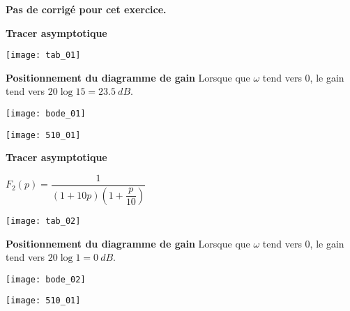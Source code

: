 \normaltrue \difficilefalse \tdifficilefalse
\correctiontrue


\setcounter{numques}{0}
\ifcorrection
\else
\textbf{Pas de corrigé pour cet exercice.}
\fi


\ifprof 
\else
 \fi
 

\ifprof

\textbf{Tracer asymptotique}

\begin{center}
\texttt{[image: tab\_01]}
\end{center}


\textbf{Positionnement du diagramme de gain}
Lorsque que $\omega$ tend vers 0, le gain tend vers $20 \log 15 = \SI{23,5}{dB}$.

\begin{center}
\texttt{[image: bode\_01]}
\end{center}

\else 
\begin{center}
\texttt{[image: 510\_01]}
\end{center}
\fi


\ifprof
\textbf{Tracer asymptotique}

$F_2(p)=\dfrac{1}{\left(1+10p\right)\left(1+\dfrac{p}{10}\right)}$

\begin{center}
\texttt{[image: tab\_02]}
\end{center}


\textbf{Positionnement du diagramme de gain}
Lorsque que $\omega$ tend vers 0, le gain tend vers $20 \log 1 = \SI{0}{dB}$.

\begin{center}
\texttt{[image: bode\_02]}
\end{center}

\else 
\begin{center}
\texttt{[image: 510\_01]}
\end{center}
\fi


